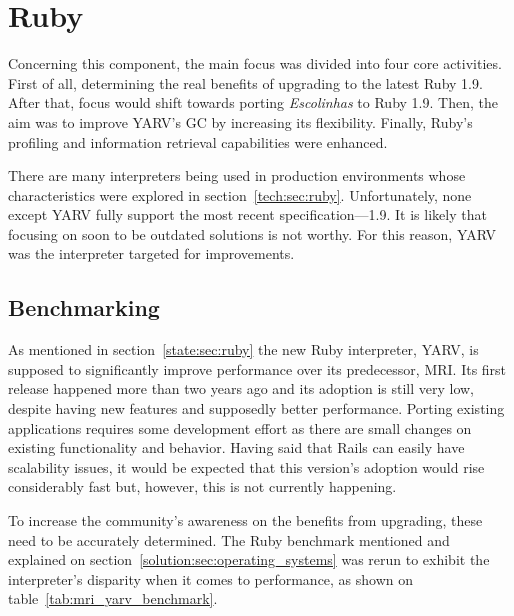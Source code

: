 \section{Ruby} %
\label{solution:sec:ruby}

Concerning this component, the main focus was divided into four core activities. First of all, determining the real benefits of upgrading to the latest Ruby 1.9. After that, focus would shift towards porting \textit{Escolinhas} to Ruby 1.9. Then, the aim was to improve YARV's GC by increasing its flexibility. Finally, Ruby's profiling and information retrieval capabilities were enhanced.

There are many interpreters being used in production environments whose characteristics were explored in section~\ref{tech:sec:ruby}. Unfortunately, none except YARV fully support the most recent specification---1.9. It is likely that focusing on soon to be outdated solutions is not worthy. For this reason, YARV was the interpreter targeted for improvements.


\subsection{Benchmarking}
As mentioned in section~\ref{state:sec:ruby} the new Ruby interpreter, YARV, is supposed to significantly improve performance over its predecessor, MRI. Its first release happened more than two years ago and its adoption is still very low, despite having new features and supposedly better performance. Porting existing applications requires some development effort as there are small changes on existing functionality and behavior. Having said that Rails can easily have scalability issues, it would be expected that this version's adoption would rise considerably fast but, however, this is not currently happening.

To increase the community's awareness on the benefits from upgrading, these need to be accurately determined. The Ruby benchmark mentioned and explained on section~\ref{solution:sec:operating_systems} was rerun to exhibit the interpreter's disparity when it comes to performance, as shown on table~\ref{tab:mri_yarv_benchmark}.

